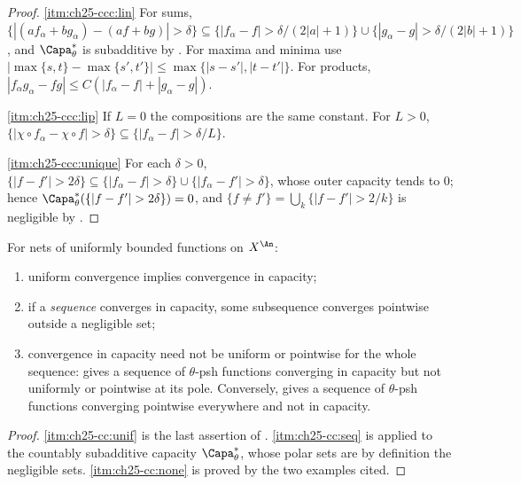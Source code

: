 \begin{proof}
\cref{itm:ch25-ccc:lin}  For sums, $\{|(af_\alpha+bg_\alpha)-(af+bg)|
>\delta\}\subseteq\{|f_\alpha-f|>\delta/(2|a|+1)\}\cup
\{|g_\alpha-g|>\delta/(2|b|+1)\}$, and $\Capa^*_\theta$ is subadditive by
.  For maxima and minima use
$|\max\{s,t\}-\max\{s',t'\}|\leq\max\{|s-s'|,|t-t'|\}$.  For products,
$|f_\alpha g_\alpha-fg|\leq C(|f_\alpha-f|+|g_\alpha-g|)$.

\cref{itm:ch25-ccc:lip}  If $L=0$ the compositions are the same constant.
For $L>0$, $\{|\chi\circ f_\alpha-\chi\circ f|>\delta\}
\subseteq\{|f_\alpha-f|>\delta/L\}$.

\cref{itm:ch25-ccc:unique}  For each $\delta>0$,
$\{|f-f'|>2\delta\}\subseteq\{|f_\alpha-f|>\delta\}\cup
\{|f_\alpha-f'|>\delta\}$, whose outer capacity tends to $0$; hence
$\Capa^*_\theta(\{|f-f'|>2\delta\})=0$, and
$\{f\neq f'\}=\bigcup_k\{|f-f'|>2/k\}$ is negligible by
.
\end{proof}

\begin{proposition}
\label{prop:ch25-convergence-comparison}
For nets of uniformly bounded functions on $X^{\An}$:
\begin{enumerate}
\item\label{itm:ch25-cc:unif}
 uniform convergence implies convergence in capacity;
\item\label{itm:ch25-cc:seq}
 if a \emph{sequence} converges in capacity, some subsequence converges
 pointwise outside a negligible set;
\item\label{itm:ch25-cc:none}
 convergence in capacity need not be uniform or pointwise for the whole
 sequence: 
 gives a sequence of $\theta$-psh functions converging in capacity but not
 uniformly or pointwise at its pole.  Conversely,
  gives a sequence of
 $\theta$-psh functions converging pointwise everywhere and not in
 capacity.
\end{enumerate}
\end{proposition}

\begin{proof}
\cref{itm:ch25-cc:unif} is the last assertion of
.  \cref{itm:ch25-cc:seq} is
 applied to the countably subadditive
capacity $\Capa^*_\theta$, whose polar sets are by definition the
negligible sets.  \cref{itm:ch25-cc:none} is proved by the two examples
cited.
\end{proof}

